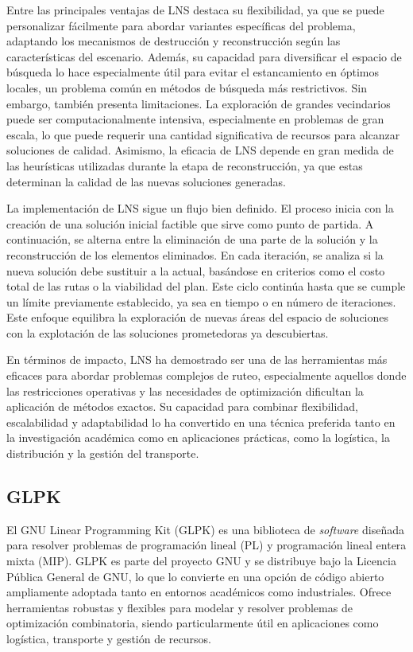 \documentclass{article}
\begin{document}
Entre las principales ventajas de LNS destaca su flexibilidad, ya que se puede personalizar fácilmente para abordar variantes específicas del problema, adaptando los mecanismos de destrucción y reconstrucción según las características del escenario. Además, su capacidad para diversificar el espacio de búsqueda lo hace especialmente útil para evitar el estancamiento en óptimos locales, un problema común en métodos de búsqueda más restrictivos. Sin embargo, también presenta limitaciones. La exploración de grandes vecindarios puede ser computacionalmente intensiva, especialmente en problemas de gran escala, lo que puede requerir una cantidad significativa de recursos para alcanzar soluciones de calidad. Asimismo, la eficacia de LNS depende en gran medida de las heurísticas utilizadas durante la etapa de reconstrucción, ya que estas determinan la calidad de las nuevas soluciones generadas.\cite{ref4}

La implementación de LNS sigue un flujo bien definido. El proceso inicia con la creación de una solución inicial factible que sirve como punto de partida. A continuación, se alterna entre la eliminación de una parte de la solución y la reconstrucción de los elementos eliminados. En cada iteración, se analiza si la nueva solución debe sustituir a la actual, basándose en criterios como el costo total de las rutas o la viabilidad del plan. Este ciclo continúa hasta que se cumple un límite previamente establecido, ya sea en tiempo o en número de iteraciones. Este enfoque equilibra la exploración de nuevas áreas del espacio de soluciones con la explotación de las soluciones prometedoras ya descubiertas.

En términos de impacto, LNS ha demostrado ser una de las herramientas más eficaces para abordar problemas complejos de ruteo, especialmente aquellos donde las restricciones operativas y las necesidades de optimización dificultan la aplicación de métodos exactos. Su capacidad para combinar flexibilidad, escalabilidad y adaptabilidad lo ha convertido en una técnica preferida tanto en la investigación académica como en aplicaciones prácticas, como la logística, la distribución y la gestión del transporte.

\subsection{GLPK}
El GNU Linear Programming Kit (GLPK) es una biblioteca de \textit{software} diseñada para resolver problemas de programación lineal (PL) y programación lineal entera mixta (MIP). GLPK es parte del proyecto GNU y se distribuye bajo la Licencia Pública General de GNU, lo que lo convierte en una opción de código abierto ampliamente adoptada tanto en entornos académicos como industriales. Ofrece herramientas robustas y flexibles para modelar y resolver problemas de optimización combinatoria, siendo particularmente útil en aplicaciones como logística, transporte y gestión de recursos.
\end{document}
